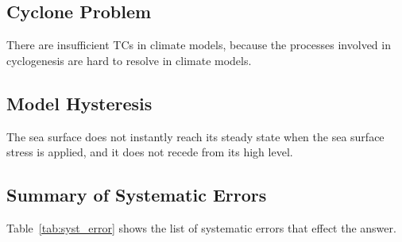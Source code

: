 \subsection{Cyclone Problem}
There are insufficient TCs in climate models, because the processes involved
in cyclogenesis are hard to resolve in climate models.

\subsection{Model Hysteresis}
The sea surface does not instantly reach its steady state when the sea surface
stress is applied, and it does not recede from its high level.


\subsection{Summary of Systematic Errors}
Table~\ref{tab:syst_error} shows the list of systematic errors that effect the
answer.

\begin{table}[ht]
\caption{Systematic sources of error for the estimate of TC-induced storm surge frequency
and severity.}
\label{tab:syst_error}
\end{table}
